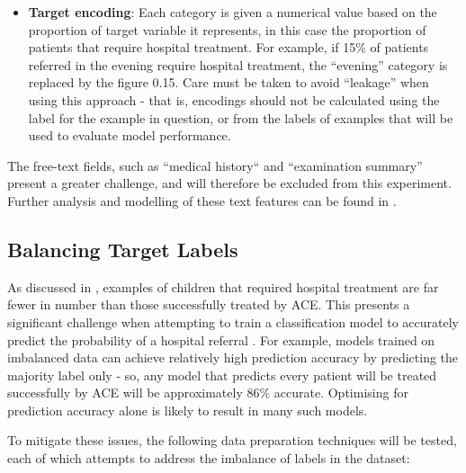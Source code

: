\begin{itemize}
    \item \textbf{Target encoding}: Each category is given a numerical value based on the proportion of target variable it represents, in this case the proportion of patients that require hospital treatment. For example, if 15\% of patients referred in the evening require hospital treatment, the ``evening'' category is replaced by the figure 0.15. Care must be taken to avoid ``leakage'' when using this approach - that is, encodings should not be calculated using the label for the example in question, or from the labels of examples that will be used to evaluate model performance.
\end{itemize}

The free-text fields, such as ``medical history`` and ``examination summary'' present a greater challenge, and will therefore be excluded from this experiment. Further analysis and modelling of these text features can be found in .

\subsection{Balancing Target Labels}\label{subsec:balancing-target-labels}

As discussed in , examples of children that required hospital treatment are far fewer in number than those successfully treated by ACE. This presents a significant challenge when attempting to train a classification model to accurately predict the probability of a hospital referral \cite{imbalanced_strategies}. For example, models trained on imbalanced data can achieve relatively high prediction accuracy by predicting the majority label only - so, any model that predicts every patient will be treated successfully by ACE will be approximately 86\% accurate. Optimising for prediction accuracy alone is likely to result in many such models.

To mitigate these issues, the following data preparation techniques will be tested, each of which attempts to address the imbalance of labels in the dataset:

